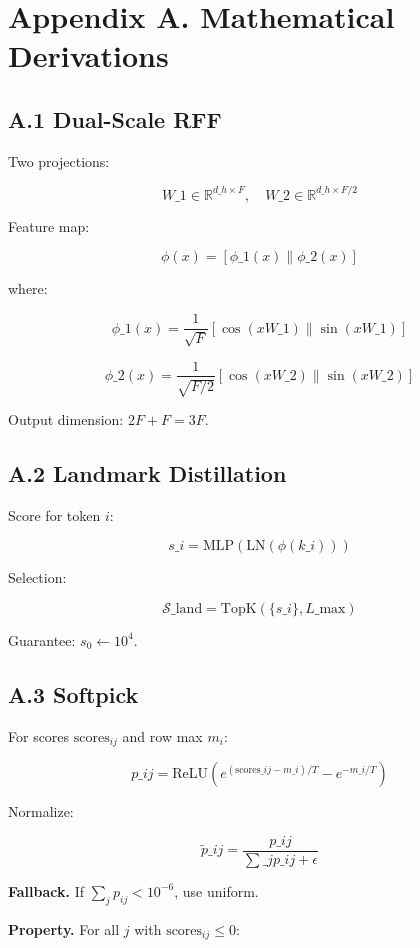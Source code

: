 \section{Appendix A. Mathematical Derivations}

\subsection{A.1 Dual-Scale RFF}

Two projections:

\[
W\_1 \in \mathbb{R}^{d\_h \times F}, \quad W\_2 \in \mathbb{R}^{d\_h \times F/2}
\tag{A.1}
\]

Feature map:

\[
\phi(x) = [\phi\_1(x) \| \phi\_2(x)]
\tag{A.2}
\]

where:

\[
\phi\_1(x) = \frac{1}{\sqrt{F}} [\cos(xW\_1) \| \sin(xW\_1)]
\tag{A.3}
\]

\[
\phi\_2(x) = \frac{1}{\sqrt{F/2}} [\cos(xW\_2) \| \sin(xW\_2)]
\tag{A.4}
\]

Output dimension: $2F + F = 3F$.

\subsection{A.2 Landmark Distillation}

Score for token $i$:

\[
s\_i = \text{MLP}(\text{LN}(\phi(k\_i)))
\tag{A.5}
\]

Selection:

\[
\mathcal{S}\_\text{land} = \text{TopK}(\{s\_i\}, L\_\text{max})
\tag{A.6}
\]

Guarantee: $s_0 \leftarrow 10^4$.

\subsection{A.3 Softpick}

For scores $\text{scores}_{ij}$ and row max $m_i$:

\[
p\_{ij} = \text{ReLU}\!\left(e^{(\text{scores}\_{ij} - m\_i)/T} - e^{-m\_i/T}\right)
\tag{A.7}
\]

Normalize:

\[
\tilde{p}\_{ij} = \frac{p\_{ij}}{\sum\_j p\_{ij} + \epsilon}
\tag{A.8}
\]

\textbf{Fallback.} If $\sum_j p_{ij} < 10^{-6}$, use uniform.

\textbf{Property.} For all $j$ with $\text{scores}_{ij} \leq 0$:

